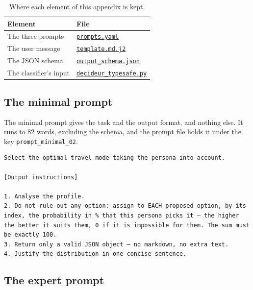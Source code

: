 \begin{table}[ht]
  \caption{Where each element of this appendix is kept.}
  \label{tab:app-files}
  \begin{tabular}{ll}
    \toprule
    Element & File \\
    \midrule
    The three prompts & \href{\repobase/packages/mobility_llm/src/mobility_llm/prompts/prompts.yaml}{\texttt{prompts.yaml}} \\
    The user message & \href{\repobase/packages/mobility_llm/src/mobility_llm/categories/itinary_multi_agent/template.md.j2}{\texttt{template.md.j2}} \\
    The JSON schema & \href{\repobase/packages/mobility_llm/src/mobility_llm/categories/itinary_multi_agent/output_schema.json}{\texttt{output\_schema.json}} \\
    The classifier's input & \href{\repobase/services/llm-agents/experiences/decideur_typesafe.py}{\texttt{decideur\_typesafe.py}} \\
    \bottomrule
  \end{tabular}
\end{table}

\subsection{The minimal prompt}
\label{app:minimal}

The minimal prompt gives the task and the output format, and nothing else. It runs to 82
words, excluding the schema, and the prompt file holds it under the key
\texttt{prompt\_minimal\_02}.

\begin{Verbatim}
Select the optimal travel mode taking the persona into account.

[Output instructions]

1. Analyse the profile.
2. Do not rule out any option: assign to EACH proposed option, by its index, the probability in % that this persona picks it — the higher the better it suits them, 0 if it is impossible for them. The sum must be exactly 100.
3. Return only a valid JSON object — no markdown, no extra text.
4. Justify the distribution in one concise sentence.
\end{Verbatim}

\subsection{The expert prompt}
\label{app:expert}

